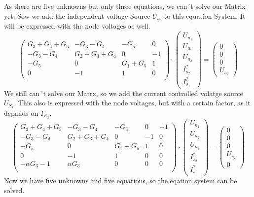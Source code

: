\documentclass[a4paper]{article}
\begin{document}
As there are five unknowns but only three equations, we can´t solve our Matrix yet.
Sow we add the independent voltage Source $U_{s_2}$ to this equation System. It will be expressed
with the node voltages as well.
\begin{equation}
      \begin{pmatrix}
            G_3 + G_4 + G_5 & -G_3 - G_4 & -G_5 & 0\\
            -G_3 -G_4 & G_2 + G_3 + G_4 & 0 & -1\\
            -G_5 & 0 & G_1 + G_5 & 1\\
            0 & -1 & 1 & 0\\
      \end{pmatrix}
      \cdot
      \begin{pmatrix}
            U_{n_1}\\U_{n_2}\\U_{n_3}\\I_{s_2}^?\\I_{s_1}^?
      \end{pmatrix}
      =
      \begin{pmatrix}
            0\\0\\0\\U_{s_2}
      \end{pmatrix}
\end{equation}
We still can´t solve our Matrx, so we add the current controlled volatge source $U_{S_1}$.
This also is expressed with the node voltages, but with a certain factor,
as it depands on $I_{R_3}$.
\begin{equation}
      \begin{pmatrix}
            G_3 + G_4 + G_5 & -G_3 - G_4 & -G_5 & 0 & -1\\
            -G_3 -G_4 & G_2 + G_3 + G_4 & 0 & -1 & 0\\
            -G_5 & 0 & G_1 + G_5 & 1 & 0\\
            0 & -1 & 1 & 0 & 0\\
            -\alpha G_3-1 & \alpha G_3 & 0 & 0 & 0\\
      \end{pmatrix}
      \cdot
      \begin{pmatrix}
            U_{n_1}\\U_{n_2}\\U_{n_3}\\I_{s_2}^?\\I_{s_1}^?
      \end{pmatrix}
      =
      \begin{pmatrix}
            0\\0\\0\\U_{s_2}\\0
      \end{pmatrix}
\end{equation}
Now we have five unknowns and five equations, so the eqation system can be solved.
\end{document}
